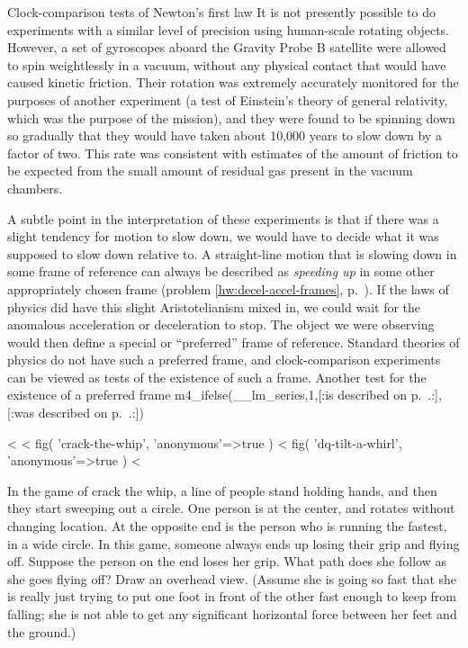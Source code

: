 \begin{eg}{Clock-comparison tests of Newton's first law}
It is not presently possible to do experiments with a similar level of precision using human-scale rotating
objects. However, a set of
gyroscopes aboard the Gravity Probe B satellite were allowed to spin weightlessly in a vacuum, without any
physical contact that would have caused kinetic friction. Their rotation was extremely accurately
monitored for the purposes of another experiment (a test of Einstein's theory of general relativity,
which was the purpose of the mission), and they were found to be spinning down so gradually
that they would have taken about 10,000 years to slow down by a factor of two. This rate was
consistent with estimates of the amount of friction to be expected from the small amount of residual
gas present in the vacuum chambers.

A subtle point in the interpretation of these experiments is that if there was a slight tendency
for motion to slow down, we would have to decide what it was supposed to slow down relative to.
A straight-line motion that is slowing down in some frame of reference can always
be described as \emph{speeding up} in some other appropriately chosen frame (problem \ref{hw:decel-accel-frames},
p.~\pageref{hw:decel-accel-frames}). If the laws of physics did have this slight Aristotelianism
mixed in, we could wait for the anomalous acceleration or deceleration to stop. The object we were
observing would then define a special or ``preferred'' frame of reference. Standard theories of
physics do not have such a preferred frame, and clock-comparison experiments can be viewed as
tests of the existence of such a frame.
Another test for the existence of a 
preferred frame m4_ifelse(__lm_series,1,[:is described on p.~\pageref{sec:battat}.:],[:was described on p.~\pageref{battat}.:])
\end{eg}

\pagebreak[4]

<%
<%
  fig(
    'crack-the-whip',
    {
      'anonymous'=>true
    }
  )
\spacebetweenfigs
<%
  fig(
    'dq-tilt-a-whirl',
    {
      'anonymous'=>true
    }
  )
<%

\startdqs

\begin{dq}\label{dq:crack-the-whip-1}
In the game of crack the whip, a line of people stand
holding hands, and then they start sweeping out a circle.
One person is at the center, and rotates without changing
location.  At the opposite end is the person who is running
the fastest, in a wide circle.  In this game, someone always
ends up losing their grip and flying off.  Suppose the
person on the end loses her grip.  What path does she follow
as she goes flying off? Draw an overhead view.  (Assume she is going so fast that
she is really just trying to put one foot in front of the
other fast enough to keep from falling; she is not able to
get any significant horizontal force between her feet and the ground.)
\end{dq}

